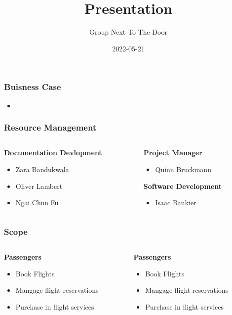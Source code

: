\documentclass[12pt]{beamer}
\title{Presentation}
\author{Group Next To The Door}
\date{2022-05-21}
\begin{document}
\begin{frame}
  \maketitle
\end{frame}

\begin{frame}[plain]
  \frametitle{Buisness Case}
  \begin{itemize}
  \item 
  \end{itemize}
\end{frame}

\begin{frame}[plain]
  \frametitle{Resource Management}
  \begin{columns}
    \begin{column}{0.5\textwidth}
      \textbf{Documentation Devlopment}
      \begin{itemize}
      \item Zara Bandukwala​
      \item Oliver Lambert​
      \item Ngai Chun Fu
      \end{itemize}
    \end{column}
    \begin{column}{0.5\textwidth}
      \textbf{Project Manager}
      \begin{itemize}
      \item Quinn Bruckmann
      \end{itemize}
      \textbf{Software Development}
      \begin{itemize}
      \item Isaac Bankier
      \end{itemize}
    \end{column}
  \end{columns}
\end{frame}

\begin{frame}[plain]
  \frametitle{Scope}
  \begin{columns}
    \begin{column}{0.5\textwidth}
      \textbf{Passengers}
      \begin{itemize}
      \item Book Flights
      \item Mangage flight reservations
      \item Purchase in flight services
      \end{itemize}
    \end{column}
    \begin{column}{0.5\textwidth}
      \textbf{Passengers}
      \begin{itemize}
      \item Book Flights
      \item Mangage flight reservations
      \item Purchase in flight services
      \end{itemize}
    \end{column}
  \end{columns}
\end{frame}
\end{document}
